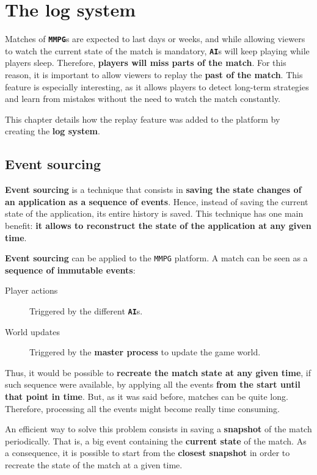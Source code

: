 \documentclass[a4paper,11pt,titlepage,abstract,numbers=noenddot,automark,mnsy,intlimits,rgb,dvipsnames]{report}
\begin{document}
\chapter{The log system}
Matches of \textbf{\texttt{MMPG}}s are expected to last days or weeks, and while allowing viewers to watch the current state of
the match is mandatory, \textbf{\texttt{AI}}s will keep playing while players sleep. Therefore, \textbf{players will miss parts of the match}.
For this reason, it is important to allow viewers to replay the \textbf{past of the match}. This feature is especially
interesting, as it allows players to detect long-term strategies and learn from mistakes without the need to watch the
match constantly.

This chapter details how the replay feature was added to the platform by creating the \textbf{log system}.
\section{Event sourcing}
\textbf{Event sourcing} \cite{event_sourcing} is a technique that consists in \textbf{saving the state changes of an application as a
sequence of events}. Hence, instead of saving the current state of the application, its entire history is saved. This technique
has one main benefit: \textbf{it allows to reconstruct the state of the application at any given time}.

\textbf{Event sourcing} can be applied to the \texttt{MMPG} platform. A match can be seen as a \textbf{sequence of immutable events}:
\begin{description}
\item[Player actions]
Triggered by the different \textbf{\texttt{AI}}s.
\item[World updates]
Triggered by the \textbf{master process} to update the game world.
\end{description}
Thus, it would be possible to \textbf{recreate the match state at any given time}, if such sequence were available, by applying
all the events \textbf{from the start until that point in time}. But, as it was said before, matches can be quite long. Therefore,
processing all the events might become really time consuming.

An efficient way to solve this problem consists in saving a \textbf{snapshot} of the match periodically. That is, a big event
containing the \textbf{current state} of the match. As a consequence, it is possible to start from the \textbf{closest snapshot} in order
to recreate the state of the match at a given time.
\end{document}
